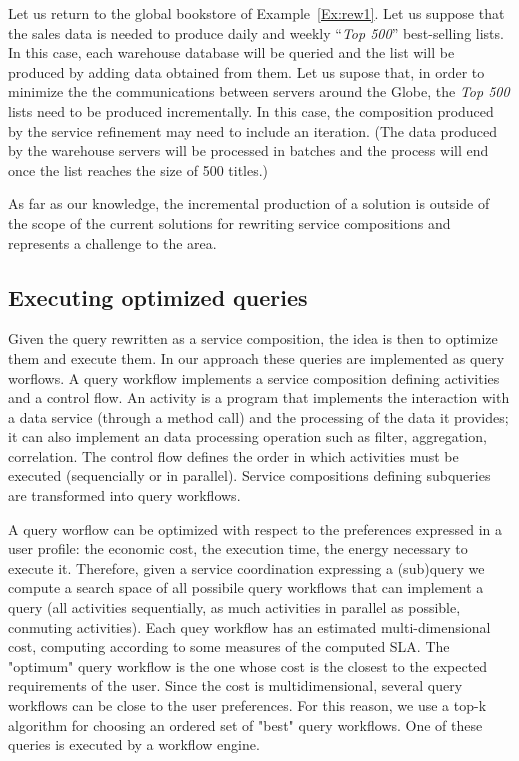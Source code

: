 \begin{example}\label{Ex:rew2}
Let us return to the global bookstore of Example~\ref{Ex:rew1}.
Let us suppose that the sales data is needed to produce daily and weekly ``\textit{Top 500}'' best-selling lists.
In this case, each warehouse database will be queried and the list will be produced by adding data obtained from them.
Let us supose that, in order to minimize the the communications between servers around the Globe, the \textit{Top 500} lists need to be produced incrementally.
In this case, the composition produced by the service refinement may need to include an iteration.
(The data produced by the warehouse servers will be processed in batches and the process will end once the list reaches the size of 500 titles.)

As far as our knowledge, the incremental production of a solution is outside of the scope of the current solutions for rewriting service compositions and represents a challenge to the area.
~\hfill\openbox
\end{example}


\subsection{Executing optimized queries}
\label{sec:queryOpt}
Given the query rewritten as a service composition, the idea is then to optimize them and execute them. In our approach these queries are implemented as query worflows. A query workflow implements a service composition defining activities and a control flow. An activity is a program that implements the interaction with a data service (through a method call) and the processing of the data it provides; it can also implement an data processing operation such as filter, aggregation, correlation. The control flow defines the order in which activities must be executed (sequencially or in parallel). Service compositions defining subqueries are transformed into query workflows.

A query worflow can be optimized with respect to the preferences expressed in a user profile: the economic cost, the execution time, the energy necessary to execute it. Therefore, given a service coordination expressing a (sub)query we compute a search space of all possibile query workflows that can implement a query (all activities sequentially, as much activities in parallel as possible, conmuting activities). Each quey workflow has an estimated multi-dimensional cost, computing according to some measures of the computed SLA. The "optimum" query workflow is the one whose cost is the closest to the expected requirements of the user. Since the cost is multidimensional, several query workflows can be close to the user preferences. For this reason, we use a top-k algorithm for choosing an ordered set of "best" query workflows. One of these queries is executed by a workflow engine.


